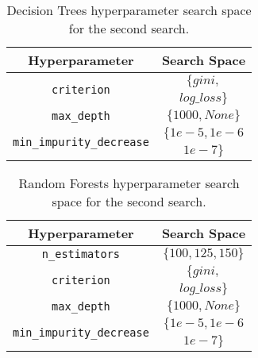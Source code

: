 
\begin{table}[H]
    \centering
    \begin{tabular}{|c|c|}
        \hline
        
        \textbf{Hyperparameter} & 
        \textbf{Search Space} \\
        
        \hline
        
        \multirow{2}{*}{\texttt{criterion}} & 
        $\{gini,$ \\ 
        & $ log\_loss\}$ \\

        \hline
        
        \texttt{max\_depth} & 
        $\{1000, None\}$ \\

        \hline
        
        \multirow{2}{*}{\texttt{min\_impurity\_decrease}} & 
        $\{1e-5, 1e-6$ \\ 
        & $ 1e-7\}$\\

        \hline
    \end{tabular}
    \caption{Decision Trees hyperparameter 
    search space for the second search.}
    \label{tab:dt_search_spaces_2}
\end{table}

\begin{table}[H]
    \centering
    \begin{tabular}{|c|c|}
        \hline
        
        \textbf{Hyperparameter} & 
        \textbf{Search Space} \\
        
        \hline
        
        \texttt{n\_estimators} & 
        $\{100, 125, 150\}$ \\

        \hline
        
        \multirow{2}{*}{\texttt{criterion}} & 
        $\{gini,$ \\ 
        & $ log\_loss\}$ \\

        \hline
        
        \texttt{max\_depth} & 
        $\{1000, None\}$ \\

        \hline
        
        \multirow{2}{*}{\texttt{min\_impurity\_decrease}} & 
        $\{1e-5, 1e-6$ \\ 
        & $ 1e-7\}$\\

        \hline
    \end{tabular}
    \caption{Random Forests hyperparameter 
    search space for the second search.}
    \label{tab:rf_search_spaces_2}
\end{table}

